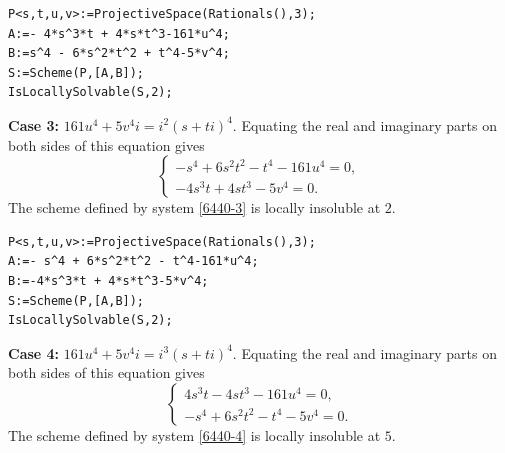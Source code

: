\documentclass[a4paper,12pt,english,reqno]{amsart}
\begin{document}
\begin{lstlisting}
P<s,t,u,v>:=ProjectiveSpace(Rationals(),3);
A:=- 4*s^3*t + 4*s*t^3-161*u^4;
B:=s^4 - 6*s^2*t^2 + t^4-5*v^4;
S:=Scheme(P,[A,B]);
IsLocallySolvable(S,2);
\end{lstlisting}

{\bf Case 3:} $161u^4+5v^4i=i^2(s+ti)^4$. Equating the real and imaginary parts on both sides of this equation gives
\begin{equation}\label{6440-3}
\begin{cases}
-s^4 + 6s^2t^2 - t^4 -161u^4=0,\\
-4s^3t + 4st^3 - 5v^4=0.
\end{cases}
\end{equation}
The scheme defined by system \eqref{6440-3} is locally insoluble at $2$.


\begin{lstlisting}
P<s,t,u,v>:=ProjectiveSpace(Rationals(),3);
A:=- s^4 + 6*s^2*t^2 - t^4-161*u^4;
B:=-4*s^3*t + 4*s*t^3-5*v^4;
S:=Scheme(P,[A,B]);
IsLocallySolvable(S,2);
\end{lstlisting}


{\bf Case 4:} $161u^4+5v^4i=i^3(s+ti)^4$. Equating the real and imaginary parts on both sides of this equation gives
\begin{equation}\label{6440-4}
\begin{cases}
4s^3t - 4st^3 -161u^4=0,\\
-s^4 + 6s^2t^2 - t^4 - 5v^4=0.
\end{cases}
\end{equation}
The scheme defined by system \eqref{6440-4} is locally insoluble at $5$.

\end{document}
